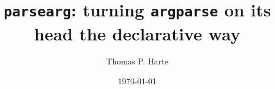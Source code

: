 \documentclass[10pt]{amsart}
\author{Thomas P. Harte}
\date{\today}
\title{\texttt{parsearg}: turning \texttt{argparse} on its head the declarative way}
\numberwithin{equation}{section}
\begin{document}
\maketitle
\tableofcontents

\newcommand{\inv}[1]{{#1}^{-1}}

\newcommand{\envert}[1]{\left\lvert#1\right\rvert}
\let\abs=\envert

\newcommand{\enVert}[1]{\left\lVert#1\right\rVert}

\let\norm=\enVert

\newcommand{\PE}{\mbox{PE}}             %

\newcommand{\EVA}{\mbox{EVA}}             %
\newcommand{\CTE}{\mbox{CTE}}             %
\newcommand{\VaR}{\mbox{VaR}}             %
\newcommand{\PAR}{\mbox{PAR}}             %
\newcommand{\TR}{\mbox{TR}}             %

\newcommand{\Primafacie}{\emph{Prima facie\/}}
\newcommand{\primafacie}{\emph{prima facie\/}}
\newcommand{\Mutatis}{\emph{Mutatis mutandis\/}}
\newcommand{\mutatis}{\emph{mutatis mutandis\/}}
\newcommand{\Apriori}{\emph{A~priori\/}}
\newcommand{\apriori}{\emph{a~priori\/}}
\newcommand{\Adhoc}{\emph{Ad~hoc\/}}
\newcommand{\adhoc}{\emph{ad~hoc\/}}
\newcommand{\qua}{\emph{qua\/}}
\newcommand{\etc}{\emph{etc.\/}}
\newcommand{\ie}{\emph{i.e.\/}}
\newcommand{\eg}{\emph{e.g.\/}}
\newcommand{\viz}{\emph{viz.\/}}
\newcommand{\perse}{\emph{per~se\/}}
\newcommand{\intoto}{\emph{in~toto\/}}
\newcommand{\interalia}{\emph{inter~alia\/}}
\newcommand{\notabene}{\emph{nota~bene\/}}
\newcommand{\Notabene}{\emph{Nota~bene\/}}
\newcommand{\etal}{\emph{et~al.,\/}}
\newcommand{\cf}{cf.\/}                %
\newcommand{\sic}{[\emph{sic}]}
\newcommand{\etseq}{\emph{et~seq.\/}}        %
\newcommand{\etsqq}{\emph{et~sqq.\/}}        %
\newcommand{\Page}{\emph{p.\/}}            %
\newcommand{\pp}{\emph{pp.\/}}            %
\newcommand{\visavis}{\emph{vis~\`a~vis\/}}    %

\newcommand{\field}[1]{\mathbb{#1}}
\newcommand{\BB}{\field{B}}
\newcommand{\CC}{\field{C}}
\newcommand{\EE}{\field{E}}
\newcommand{\FF}{\field{F}}
\newcommand{\MM}{\field{N}}
\newcommand{\NN}{\field{N}}
\newcommand{\PP}{\field{P}}
\newcommand{\QQ}{\field{Q}}
\newcommand{\RR}{\field{R}}
\newcommand{\VV}{\field{V}}
\newcommand{\WW}{\field{W}}
\newcommand{\XX}{\field{X}}
\newcommand{\ZZ}{\field{Z}}
\end{document}
